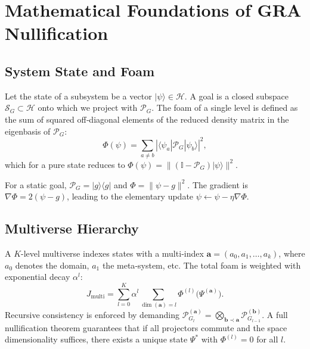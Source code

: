 \documentclass[12pt,a4paper]{article}
\begin{document}
\section{Mathematical Foundations of GRA Nullification}

\subsection{System State and Foam}
Let the state of a subsystem be a vector $|\psi\rangle \in \mathcal{H}$.
A goal is a closed subspace $\mathcal{S}_G \subset \mathcal{H}$ onto which we project with $\mathcal{P}_G$.
The foam of a single level is defined as the sum of squared off‑diagonal elements of the reduced density matrix in the eigenbasis of $\mathcal{P}_G$:
\begin{equation}\label{eq:foam}
\Phi(\psi) = \sum_{a \neq b} |\langle \psi_a | \mathcal{P}_G | \psi_b \rangle|^2,
\end{equation}
which for a pure state reduces to $\Phi(\psi) = \| (\mathbb{I}-\mathcal{P}_G)|\psi\rangle \|^2$.

For a static goal, $\mathcal{P}_G = |g\rangle\langle g|$ and $\Phi = \|\psi - g\|^2$.
The gradient is $\nabla \Phi = 2(\psi - g)$, leading to the elementary update $\psi \leftarrow \psi - \eta \nabla \Phi$.

\subsection{Multiverse Hierarchy}
A $K$-level multiverse indexes states with a multi‑index $\mathbf{a} = (a_0,a_1,\dots,a_k)$,
where $a_0$ denotes the domain, $a_1$ the meta‑system, etc.
The total foam is weighted with exponential decay $\alpha^l$:
\begin{equation}
J_{\text{multi}} = \sum_{l=0}^{K} \alpha^l \sum_{\dim(\mathbf{a})=l} \Phi^{(l)}\big(\Psi^{(\mathbf{a})}\big).
\end{equation}
Recursive consistency is enforced by demanding
$\mathcal{P}_{G_l}^{(\mathbf{a})} = \bigotimes_{\mathbf{b}\prec\mathbf{a}} \mathcal{P}_{G_{l-1}}^{(\mathbf{b})}$.
A full nullification theorem guarantees that if all projectors commute and the space dimensionality suffices,
there exists a unique state $\Psi^*$ with $\Phi^{(l)}=0$ for all $l$.
\end{document}
